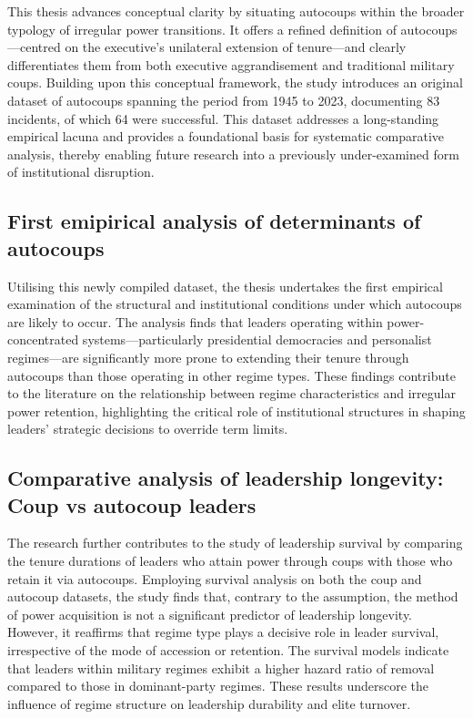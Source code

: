 \documentclass[
  12pt,
]{report}
\begin{document}
This thesis advances conceptual clarity by situating autocoups within
the broader typology of irregular power transitions. It offers a refined
definition of autocoups---centred on the executive's unilateral
extension of tenure---and clearly differentiates them from both
executive aggrandisement and traditional military coups. Building upon
this conceptual framework, the study introduces an original dataset of
autocoups spanning the period from 1945 to 2023, documenting 83
incidents, of which 64 were successful. This dataset addresses a
long-standing empirical lacuna and provides a foundational basis for
systematic comparative analysis, thereby enabling future research into a
previously under-examined form of institutional disruption.

\subsection*{First emipirical analysis of determinants of
autocoups}\label{first-emipirical-analysis-of-determinants-of-autocoups}

Utilising this newly compiled dataset, the thesis undertakes the first
empirical examination of the structural and institutional conditions
under which autocoups are likely to occur. The analysis finds that
leaders operating within power-concentrated systems---particularly
presidential democracies and personalist regimes---are significantly
more prone to extending their tenure through autocoups than those
operating in other regime types. These findings contribute to the
literature on the relationship between regime characteristics and
irregular power retention, highlighting the critical role of
institutional structures in shaping leaders' strategic decisions to
override term limits.

\subsection*{Comparative analysis of leadership longevity: Coup vs
autocoup
leaders}\label{comparative-analysis-of-leadership-longevity-coup-vs-autocoup-leaders}

The research further contributes to the study of leadership survival by
comparing the tenure durations of leaders who attain power through coups
with those who retain it via autocoups. Employing survival analysis on
both the coup and autocoup datasets, the study finds that, contrary to
the assumption, the method of power acquisition is not a significant
predictor of leadership longevity. However, it reaffirms that regime
type plays a decisive role in leader survival, irrespective of the mode
of accession or retention. The survival models indicate that leaders
within military regimes exhibit a higher hazard ratio of removal
compared to those in dominant-party regimes. These results underscore
the influence of regime structure on leadership durability and elite
turnover.
\end{document}
